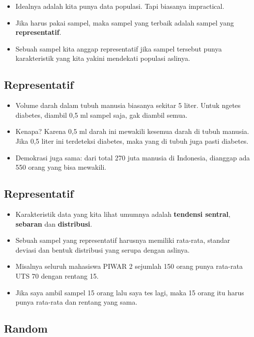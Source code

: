 \documentclass[
  letterpaper,
  DIV=11,
  numbers=noendperiod]{scrartcl}
\begin{document}
\begin{itemize}
\item
  Idealnya adalah kita punya data populasi. Tapi biasanya impractical.
\item
  Jika harus pakai sampel, maka sampel yang terbaik adalah sampel yang
  \textbf{representatif}.
\item
  Sebuah sampel kita anggap representatif jika sampel tersebut punya
  karakteristik yang kita yakini mendekati populasi aslinya.
\end{itemize}

\subsection{Representatif}\label{representatif}

\begin{itemize}
\item
  Volume darah dalam tubuh manusia biasanya sekitar 5 liter. Untuk
  ngetes diabetes, diambil 0,5 ml sampel saja, gak diambil semua.
\item
  Kenapa? Karena 0,5 ml darah ini mewakili kesemua darah di tubuh
  manusia. Jika 0,5 liter ini terdeteksi diabetes, maka yang di tubuh
  juga pasti diabetes.
\item
  Demokrasi juga sama: dari total 270 juta manusia di Indonesia,
  dianggap ada 550 orang yang bisa mewakili.
\end{itemize}

\subsection{Representatif}\label{representatif-1}

\begin{itemize}
\item
  Karakteristik data yang kita lihat umumnya adalah \textbf{tendensi
  sentral}, \textbf{sebaran} dan \textbf{distribusi}.
\item
  Sebuah sampel yang representatif harusnya memiliki rata-rata, standar
  deviasi dan bentuk distribusi yang serupa dengan aslinya.
\item
  Misalnya seluruh mahasiswa PIWAR 2 sejumlah 150 orang punya rata-rata
  UTS 70 dengan rentang 15.
\item
  Jika saya ambil sampel 15 orang lalu saya tes lagi, maka 15 orang itu
  harus punya rata-rata dan rentang yang sama.
\end{itemize}

\subsection{Random}\label{random}
\end{document}
